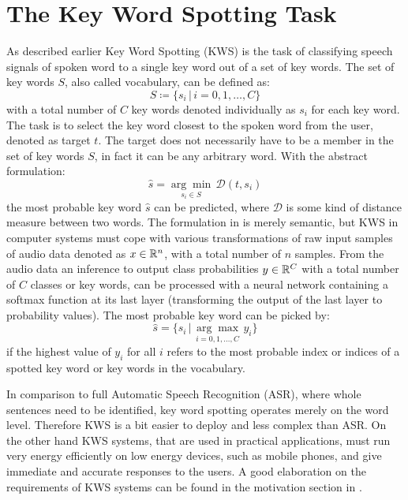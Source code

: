 
\section{The Key Word Spotting Task}\label{sec:intro_kws}
\thesisStateRevised
As described earlier Key Word Spotting (KWS) is the task of classifying speech signals of spoken word to a single key word out of a set of key words.
The set of key words $S$, also called vocabulary, can be defined as:
\begin{equation}\label{eq:intro_kws_dict}
	S \coloneqq \{s_i \, | \, i = 0, 1, \dots, C\}
\end{equation}
with a total number of $C$ key words denoted individually as $s_i$ for each key word.
The task is to select the key word closest to the spoken word from the user, denoted as target $t$.
The target does not necessarily have to be a member in the set of key words $S$, in fact it can be any arbitrary word.
With the abstract formulation:
\begin{equation}\label{eq:intro_kws_task}
	\hat{s} = \underset{s_i \in S}{\arg \min} \, \mathcal{D}(t, s_i)
\end{equation}
the most probable key word $\hat{s}$ can be predicted, where $\mathcal{D}$ is some kind of distance measure between two words.
The formulation in  is merely semantic, but KWS in computer systems must cope with various transformations of raw input samples of audio data denoted as $x \in \mathbb{R}^n$, with a total number of $n$ samples.
From the audio data an inference to output class probabilities $y \in \mathbb{R}^C$ with a total number of $C$ classes or key words, can be processed with a neural network containing a softmax function at its last layer (transforming the output of the last layer to probability values).
The most probable key word can be picked by:
\begin{equation}\label{eq:intro_kws_class}
	\hat{s} = \{s_i \, | \, \underset{i = 0, 1, \dots, C}{\arg \max} \, y_i\}
\end{equation}
if the highest value of $y_i$ for all $i$ refers to the most probable index or indices of a spotted key word or key words in the vocabulary.

In comparison to full Automatic Speech Recognition (ASR), where whole sentences need to be identified, key word spotting operates merely on the word level.
Therefore KWS is a bit easier to deploy and less complex than ASR.
On the other hand KWS systems, that are used in practical applications, must run very energy efficiently on low energy devices, such as mobile phones, and give immediate and accurate responses to the users. 
A good elaboration on the requirements of KWS systems can be found in the motivation section in \cite{Warden2018}.

